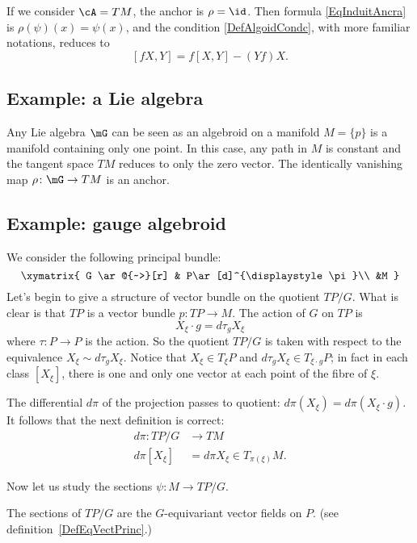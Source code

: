 If we consider $\cA=TM$, the anchor is $\rho=\id$. Then formula \eqref{EqInduitAncra} is $\rho(\psi)(x)=\psi(x)$, and the condition \eqref{DefAlgoidCondc}, with more familiar notations, reduces to
\[
	[fX,Y]=f[X,Y]-(Yf)X.
\]

\subsection{Example: a Lie algebra}

Any Lie algebra $\mG$ can be seen as an algebroid on a manifold $M=\{ p \}$ is a manifold containing only one point. In this case, any path in $M$ is constant and the tangent space $TM$ reduces to only the zero vector. The identically vanishing map $\rho\colon \mG\to TM$ is an anchor.

\subsection{Example: gauge algebroid}

We consider the following principal bundle:
\[
	\xymatrix{
		G \ar@{~>}[r] & P\ar[d]^{\displaystyle \pi}\\ &M
	}
\]
Let's begin to give a structure of vector bundle on the quotient $TP/G$. What is clear is that $TP$ is a vector bundle $p\colon TP\to M$. The action of $G$ on $TP$ is
\[
	X_{\xi}\cdot g=d\tau_{g}X_{\xi}
\]
where $\tau\colon P\to P$ is the action. So the quotient $TP/G$ is taken with respect to the equivalence $X_{\xi}\sim d\tau_{g}X_{\xi}$. Notice that $X_{\xi}\in T_{\xi}P$ and $d\tau_{g}X_{\xi}\in T_{\xi\cdot g}P$; in fact in each class $[X_{\xi}]$, there is one and only one vector at each point of the fibre of $\xi$.

The differential $d\pi$ of the projection passes to quotient: $d\pi(X_{\xi})=d\pi(X_{\xi}\cdot g)$. It follows that the next definition is correct:
\begin{equation}
	\begin{aligned}
		d\pi\colon TP/G & \to TM                           \\
		d\pi[X_{\xi}]   & = d\pi X_{\xi}\in T_{\pi(\xi)}M.
	\end{aligned}
\end{equation}

Now let us study the sections $\psi\colon M\to TP/G$.

\begin{lemma}
	The sections of $TP/G$ are the $G$-equivariant vector fields on $P$. (see definition~\ref{DefEqVectPrinc}.)
\end{lemma}

